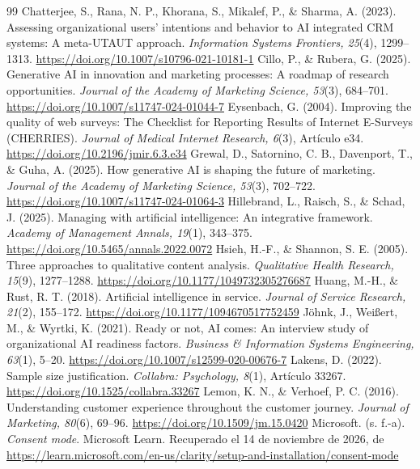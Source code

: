 \documentclass[12pt,letterpaper]{article}
\begin{document}
\begin{thebibliography}{99}
 Chatterjee, S., Rana, N. P., Khorana, S., Mikalef, P., \& Sharma, A. (2023). Assessing organizational users’ intentions and behavior to AI integrated CRM systems: A meta-UTAUT approach. \emph{Information Systems Frontiers, 25}(4), 1299--1313. \url{https://doi.org/10.1007/s10796-021-10181-1}
 Cillo, P., \& Rubera, G. (2025). Generative AI in innovation and marketing processes: A roadmap of research opportunities. \emph{Journal of the Academy of Marketing Science, 53}(3), 684--701. \url{https://doi.org/10.1007/s11747-024-01044-7}
 Eysenbach, G. (2004). Improving the quality of web surveys: The Checklist for Reporting Results of Internet E-Surveys (CHERRIES). \emph{Journal of Medical Internet Research, 6}(3), Artículo e34. \url{https://doi.org/10.2196/jmir.6.3.e34}
 Grewal, D., Satornino, C. B., Davenport, T., \& Guha, A. (2025). How generative AI is shaping the future of marketing. \emph{Journal of the Academy of Marketing Science, 53}(3), 702--722. \url{https://doi.org/10.1007/s11747-024-01064-3}
 Hillebrand, L., Raisch, S., \& Schad, J. (2025). Managing with artificial intelligence: An integrative framework. \emph{Academy of Management Annals, 19}(1), 343--375. \url{https://doi.org/10.5465/annals.2022.0072}
 Hsieh, H.-F., \& Shannon, S. E. (2005). Three approaches to qualitative content analysis. \emph{Qualitative Health Research, 15}(9), 1277--1288. \url{https://doi.org/10.1177/1049732305276687}
 Huang, M.-H., \& Rust, R. T. (2018). Artificial intelligence in service. \emph{Journal of Service Research, 21}(2), 155--172. \url{https://doi.org/10.1177/1094670517752459}
 Jöhnk, J., Weißert, M., \& Wyrtki, K. (2021). Ready or not, AI comes: An interview study of organizational AI readiness factors. \emph{Business \& Information Systems Engineering, 63}(1), 5--20. \url{https://doi.org/10.1007/s12599-020-00676-7}
 Lakens, D. (2022). Sample size justification. \emph{Collabra: Psychology, 8}(1), Artículo 33267. \url{https://doi.org/10.1525/collabra.33267}
 Lemon, K. N., \& Verhoef, P. C. (2016). Understanding customer experience throughout the customer journey. \emph{Journal of Marketing, 80}(6), 69--96. \url{https://doi.org/10.1509/jm.15.0420}
 Microsoft. (s. f.-a). \emph{Consent mode}. Microsoft Learn. Recuperado el 14 de noviembre de 2026, de \url{https://learn.microsoft.com/en-us/clarity/setup-and-installation/consent-mode}

\end{thebibliography}
\end{document}
